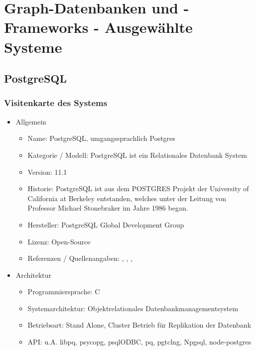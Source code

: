 \chapter{Graph-Datenbanken und -Frameworks - Ausgewählte Systeme }
\section{PostgreSQL}
\subsection{Visitenkarte des Systems}
    \begin{itemize}
        \item Allgemein
        \begin{itemize}
            \item Name: PostgreSQL, umgangssprachlich Postgres
            \item Kategorie / Modell: PostgreSQL ist ein Relationales Datenbank System
            \item Version: 11.1
            \item Historie: PostgreSQL ist aus dem POSTGRES Projekt der University of California at Berkeley entstanden, welches unter der Leitung von  Professor Michael Stonebraker im Jahre 1986 began.
            \item Hersteller: PostgreSQL Global Development Group
            \item Lizenz: Open-Source
            \item Referenzen / Quellenangaben: \cite{froehlich01}, \cite{postgres2018}, \cite{postgresqldoc}, \cite{eisentraut01}
        \end{itemize}
        \item Architektur
        \begin{itemize}
            \item Programmiersprache: C
            \item Systemarchitektur: Objektrelationales Datenbankmanagementsystem
            \item Betriebsart: Stand Alone, Cluster Betrieb für Replikation der Datenbank
            \item \ac{API}: u.A. libpq, psycopg, psqlODBC, pq, pgtclng, Npgsql, node-postgres
        \end{itemize}

\end{itemize}
